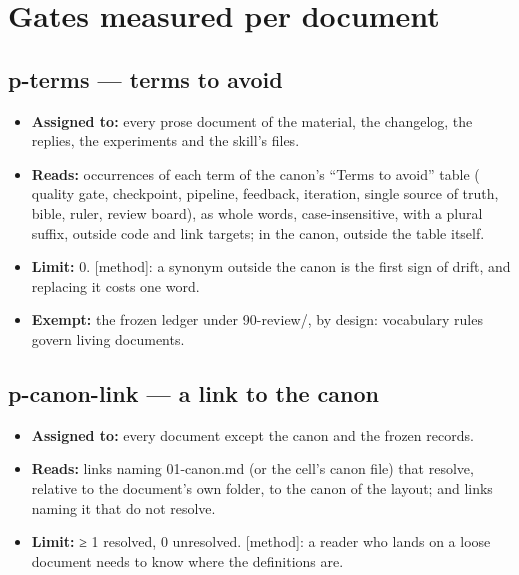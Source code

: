 \documentclass[
  american,
  10pt,
]{report}
\providecommand{\tightlist}{%
  \setlength{\itemsep}{0pt}\setlength{\parskip}{0pt}}
\renewcommand{\texttt}[1]{{\ttfamily\hyphenchar\font=-1 #1}}
\begin{document}
\section{Gates measured per document}\label{gates-measured-per-document}

\subsection{\texorpdfstring{\texttt{p-\allowbreak{}terms} --- terms to
avoid}{ --- terms to avoid}}\label{p-terms-terms-to-avoid}

\begin{itemize}
\tightlist
\item
  \textbf{Assigned to:} every prose document of the material, the
  changelog, the replies, the experiments and the skill's files.
\item
  \textbf{Reads:} occurrences of each term of the canon's ``Terms to
  avoid'' table (\texttt{quality gate}, \texttt{checkpoint},
  \texttt{pipeline}, \texttt{feedback}, \texttt{iteration},
  \texttt{single source of truth}, \texttt{bible}, \texttt{ruler},
  \texttt{review board}), as whole words, case-insensitive, with a
  plural suffix, outside code and link targets; in the canon, outside
  the table itself.
\item
  \textbf{Limit:} 0. \texttt{[method]}: a synonym outside the canon is
  the first sign of drift, and replacing it costs one word.
\item
  \textbf{Exempt:} the frozen ledger under
  \texttt{90-\allowbreak{}review/\allowbreak{}}, by design: vocabulary
  rules govern living documents.
\end{itemize}

\subsection{\texorpdfstring{\texttt{p-\allowbreak{}canon-\allowbreak{}link}
--- a link to the
canon}{ --- a link to the canon}}\label{p-canon-link-a-link-to-the-canon}

\begin{itemize}
\tightlist
\item
  \textbf{Assigned to:} every document except the canon and the frozen
  records.
\item
  \textbf{Reads:} links naming
  \texttt{01-\allowbreak{}canon.\allowbreak{}md} (or the cell's canon
  file) that resolve, relative to the document's own folder, to the
  canon of the layout; and links naming it that do not resolve.
\item
  \textbf{Limit:} ≥ 1 resolved, 0 unresolved. \texttt{[method]}: a
  reader who lands on a loose document needs to know where the
  definitions are.
\end{itemize}
\end{document}
